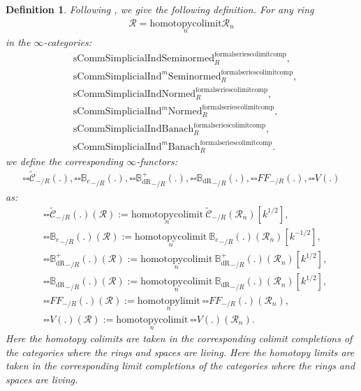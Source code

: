 \documentclass[12pt]{book}
\newtheorem{definition}{Definition}
\begin{document}
\begin{definition}
Following \cite[Definition 9.3.3, Definition 9.3.5, Definition 9.3.11, Definition 9.3.9]{KL1}, \cite{KL2} we give the following definition. For any ring
\begin{align}
\mathcal{R}=\underset{n}{\mathrm{homotopycolimit}}\mathcal{R}_n	
\end{align}
in the $\infty$-categories:
\begin{align}
&\mathrm{sComm}\mathrm{Simplicial}\mathrm{Ind}\mathrm{Seminormed}^\mathrm{formalseriescolimitcomp}_R,\\
&\mathrm{sComm}\mathrm{Simplicial}\mathrm{Ind}^m\mathrm{Seminormed}^\mathrm{formalseriescolimitcomp}_R,\\
&\mathrm{sComm}\mathrm{Simplicial}\mathrm{Ind}\mathrm{Normed}^\mathrm{formalseriescolimitcomp}_R,\\
&\mathrm{sComm}\mathrm{Simplicial}\mathrm{Ind}^m\mathrm{Normed}^\mathrm{formalseriescolimitcomp}_R,\\
&\mathrm{sComm}\mathrm{Simplicial}\mathrm{Ind}\mathrm{Banach}^\mathrm{formalseriescolimitcomp}_R,\\
&\mathrm{sComm}\mathrm{Simplicial}\mathrm{Ind}^m\mathrm{Banach}^\mathrm{formalseriescolimitcomp}_R.	
\end{align}	
we define the corresponding $\infty$-functors:
\begin{align}
{\square\square}\widetilde{\mathcal{C}}_{-/R}(.),{\square\square}{\mathbb{B}_e}_{-/R}(.),{\square\square}{\mathbb{B}_\mathrm{dR}^+}_{-/R}(.),{\square\square}{\mathbb{B}_\mathrm{dR}}_{-/R}(.),{\square\square}{FF}_{-/R}(.),{\square\square}V(.)	
\end{align}
as:
\begin{align}
&{\square\square}\widetilde{\mathcal{C}}_{-/R}(.)(\mathcal{R}):=\underset{n}{\mathrm{homotopycolimit}}~\widetilde{\mathcal{C}}_{-/R}(\mathcal{R}_n)[k^{1/2}],\\
&{\square\square}{\mathbb{B}_e}_{-/R}(.)(\mathcal{R}):=\underset{n}{\mathrm{homotopycolimit}}~{\mathbb{B}_e}_{-/R}(.)(\mathcal{R}_n)[k^{-1/2}],\\
&{\square\square}{\mathbb{B}_\mathrm{dR}^+}_{-/R}(.)(\mathcal{R}):=\underset{n}{\mathrm{homotopycolimit}}~{\mathbb{B}_\mathrm{dR}^+}_{-/R}(.)(\mathcal{R}_n)[k^{1/2}],\\
&{\square\square}{\mathbb{B}_\mathrm{dR}}_{-/R}(.)(\mathcal{R}):=\underset{n}{\mathrm{homotopycolimit}}~{\mathbb{B}_\mathrm{dR}}_{-/R}(.)(\mathcal{R}_n)[k^{1/2}],\\
&{\square\square}{{FF}}_{-/R}(.)(\mathcal{R}):=\underset{n}{\mathrm{homotopylimit}}~{\square\square}{{FF}}_{-/R}(.)(\mathcal{R}_n),\\	
&{\square\square}V(.)(\mathcal{R}):=\underset{n}{\mathrm{homotopycolimit}}~{\square\square}V(.)(\mathcal{R}_n).
\end{align}
Here the homotopy colimits are taken in the corresponding colimit completions of the categories where the rings and spaces are living. Here the homotopy limits are taken in the corresponding limit completions of the categories where the rings and spaces are living.
\end{definition}
\end{document}
